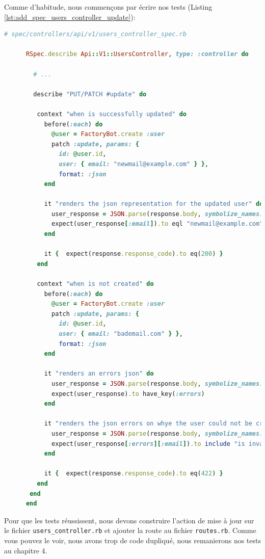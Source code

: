 \documentclass[]{report}
\begin{document}
      Comme d'habitude, nous commençons par écrire nos tests (Listing \ref{lst:add_spec_users_controller_update}):

      \begin{scriptsize}
      \begin{lstlisting}[language=ruby, caption={Les tests du contrôlleur utilisateur avec les test de mise à jour}, label={lst:add_spec_users_controller_update}]
      # spec/controllers/api/v1/users_controller_spec.rb

      RSpec.describe Api::V1::UsersController, type: :controller do

        # ...

        describe "PUT/PATCH #update" do

         context "when is successfully updated" do
           before(:each) do
             @user = FactoryBot.create :user
             patch :update, params: {
               id: @user.id,
               user: { email: "newmail@example.com" } },
               format: :json
           end

           it "renders the json representation for the updated user" do
             user_response = JSON.parse(response.body, symbolize_names: true)
             expect(user_response[:email]).to eql "newmail@example.com"
           end

           it {  expect(response.response_code).to eq(200) }
         end

         context "when is not created" do
           before(:each) do
             @user = FactoryBot.create :user
             patch :update, params: {
               id: @user.id,
               user: { email: "bademail.com" } },
               format: :json
           end

           it "renders an errors json" do
             user_response = JSON.parse(response.body, symbolize_names: true)
             expect(user_response).to have_key(:errors)
           end

           it "renders the json errors on whye the user could not be created" do
             user_response = JSON.parse(response.body, symbolize_names: true)
             expect(user_response[:errors][:email]).to include "is invalid"
           end

           it {  expect(response.response_code).to eq(422) }
         end
       end
      end
      \end{lstlisting}
      \end{scriptsize}

      Pour que les tests réussissent, nous devons construire l'action de mise à jour sur le fichier \verb|users_controller.rb| et ajouter la route au fichier \verb|routes.rb|. Comme vous pouvez le voir, nous avons trop de code dupliqué, nous remanierons nos tests au chapitre 4.
\end{document}
